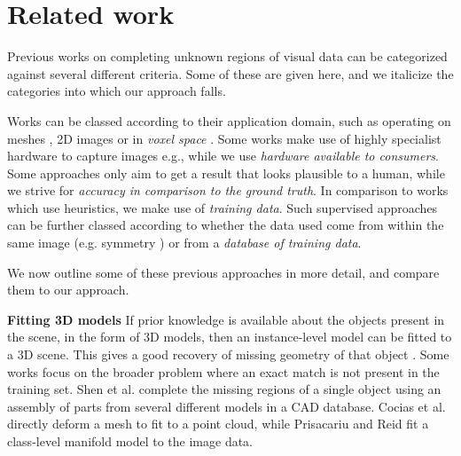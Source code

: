 \documentclass[10pt,twocolumn,letterpaper]{article}
\makeatletter
\renewcommand*{\eg}{e.g.\@\xspace}
\newcommand*{\ea}{et al.\@\xspace}
\renewcommand{\paragraph}{\vspace{2pt}\noindent\textbf}
\makeatother
\begin{document}
\section{Related work}



Previous works on completing unknown regions of visual data can be categorized against several different criteria.
Some of these are given here, and we italicize the categories into which our approach falls.

Works can be classed according to their application domain, such as operating on meshes \cite{harary-tog-2013, schnabel-eurographics-2009}, 2D images \cite{gupta-cvpr-2011} or in \emph{voxel space} \cite{kim-iccv-2013}.
Some works make use of highly specialist hardware to capture images \eg \cite{velten-nature-2012}, while we use \emph{hardware available to consumers}.
Some approaches only aim to get a result that looks plausible to a human, while we strive for \emph{accuracy in comparison to the ground truth}.
In comparison to works which use heuristics, we make use of \emph{training data}.
Such supervised approaches can be further classed according to whether the data used come from within the same image (\eg symmetry \cite{kroemer-humanoids-2012}) or from a \emph{database of training data}.

We now outline some of these previous approaches in more detail, and compare them to our approach.


\paragraph{Fitting 3D models}
If prior knowledge is available about the objects present in the scene, in the form of 3D models, then an instance-level model can be fitted to a 3D scene.
This gives a good recovery of missing geometry of that object \cite{hinterstoisser-accv-2012, drost-3dimpvt-2012}.
Some works focus on the broader problem where an exact match is not present in the training set.
Shen \ea \cite{shen-tog-2012} complete the missing regions of a single object using an assembly of parts from several different models in a CAD database.
Cocias \ea \cite{cocias-cgvcv-2013} directly deform a mesh to fit to a point cloud, while Prisacariu and Reid \cite{prisacariu-iccv-2011} fit a class-level manifold model to the image data.
\end{document}
